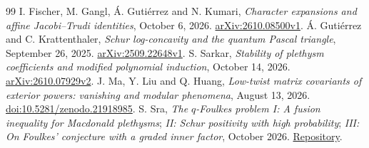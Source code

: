\documentclass[11pt]{article}
\begin{document}
{\begin{thebibliography}{99}
 I. Fischer, M. Gangl, Á. Gutiérrez and N. Kumari, \emph{Character expansions and affine Jacobi--Trudi identities}, October 6, 2026. \href{https://arxiv.org/abs/2610.08500v1}{arXiv:2610.08500v1}.
 Á. Gutiérrez and C. Krattenthaler, \emph{Schur log-concavity and the quantum Pascal triangle}, September 26, 2025. \href{https://arxiv.org/abs/2509.22648v1}{arXiv:2509.22648v1}.
 S. Sarkar, \emph{Stability of plethysm coefficients and modified polynomial induction}, October 14, 2026. \href{https://arxiv.org/abs/2610.07929v2}{arXiv:2610.07929v2}.
 J. Ma, Y. Liu and Q. Huang, \emph{Low-twist matrix covariants of exterior powers: vanishing and modular phenomena}, August 13, 2026. \href{https://doi.org/10.5281/zenodo.21918985}{doi:10.5281/zenodo.21918985}.
 S. Sra, \emph{The $q$-Foulkes problem I: A fusion inequality for Macdonald plethysms}; \emph{II: Schur positivity with high probability}; \emph{III: On Foulkes' conjecture with a graded inner factor}, October 2026. \href{https://github.com/suvrit/preprints/tree/4b4203fe5df28499b081de5fb475bcaf82967894/preprints}{Repository}.
\end{thebibliography}
}
\end{document}

